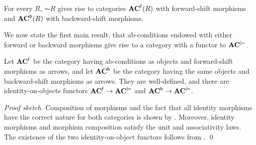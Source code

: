 %
\iffull
\begin{proposition}
For every $R$, $\AC R$ gives rise to categories $\mathbf{AC}^{\mathsf{f}}(R)$ with forward-shift morphisms and $\mathbf{AC}^{\mathsf{b}}(R)$ with backward-shift morphisms.
\end{proposition}
%
\fi
We now state the first main result, that ab-conditions endowed with either forward or backward morphisms give rise to a category with a functor to $\mathbf{AC}^{\models}$.

\begin{theorem}
Let $\mathbf{AC}^{{\mathsf{f}}}$ be the category having ab-conditions as objects and forward-shift morphisms as arrows, and let $\mathbf{AC}^{{\mathsf{b}}}$ be the category having the same objects and backward-shift morphisms as arrows. They are well-defined, and there are identity-on-objects functors $\mathbf{AC}^{{\mathsf{f}}} \rightarrow \mathbf{AC}^{\models}$ and $\mathbf{AC}^{{\mathsf{b}}} \rightarrow \mathbf{AC}^{\models}$.
\end{theorem}
%
\emph{Proof sketch.} Composition of morphisms and the fact that all identity morphisms have the correct nature for both categories is shown by .
Moreover, identity morphisms and morphism composition satisfy the unit and associativity laws. The existence of the two identity-on-object functors follows from .
\qed 

